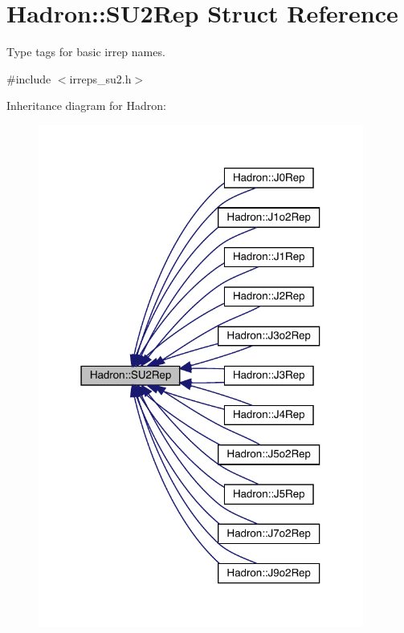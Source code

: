 \hypertarget{structHadron_1_1SU2Rep}{}\section{Hadron\+:\+:S\+U2\+Rep Struct Reference}
\label{structHadron_1_1SU2Rep}


Type tags for basic irrep names.  




{\ttfamily \#include $<$irreps\+\_\+su2.\+h$>$}



Inheritance diagram for Hadron\+:\nopagebreak
\begin{figure}[H]
\begin{center}
\leavevmode
\includegraphics[width=303pt]{de/d2f/structHadron_1_1SU2Rep__inherit__graph}
\end{center}
\end{figure}
